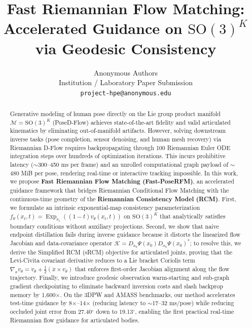 \documentclass[10pt,twocolumn,letterpaper]{article}
\DeclareMathOperator{\Exp}{Exp}
\begin{document}
\title{\textbf{Fast Riemannian Flow Matching: Accelerated Guidance on $\mathrm{SO}(3)^K$ via Geodesic Consistency}}

\author{
Anonymous Authors\\
Institution / Laboratory Paper Submission\\
{\tt\small project-hpe@anonymous.edu}
}

\maketitle

\begin{abstract}
Generative modeling of human pose directly on the Lie group product manifold $\mathcal{M} = \mathrm{SO}(3)^K$ (PoseD-Flow) achieves state-of-the-art fidelity and valid articulated kinematics by eliminating out-of-manifold artifacts. However, solving downstream inverse tasks (pose completion, sensor denoising, and human mesh recovery) via Riemannian D-Flow requires backpropagating through 100 Riemannian Euler ODE integration steps over hundreds of optimization iterations. This incurs prohibitive latency ($\sim$300--450 ms per frame) and an unrolled computational graph payload of $\sim$480 MiB per pose, rendering real-time or interactive tracking impossible. In this work, we propose \textbf{Fast Riemannian Flow Matching (Fast-PoseRFM)}, an accelerated guidance framework that bridges Riemannian Conditional Flow Matching with the continuous-time geometry of the \textbf{Riemannian Consistency Model (RCM)}. First, we formulate an intrinsic exponential-map consistency parameterization $f_\theta(x_t, t) = \Exp_{x_t}((1-t)v_\theta(x_t, t))$ on $\mathrm{SO}(3)^K$ that analytically satisfies boundary conditions without auxiliary projections. Second, we show that naive endpoint distillation fails during inverse guidance because it distorts the linearized flow Jacobian and data-covariance operator $\mathcal{K} = D_{x_0}\Psi(x_0) D_{x_0}\Psi(x_0)^*$; to resolve this, we derive the Simplified RCM (sRCM) objective for articulated joints, proving that the Levi-Civita covariant derivative reduces to a Lie bracket Coriolis term $\nabla_{\dot{x}} v_\theta = \dot{v}_\theta + \frac{1}{2}(\dot{x} \times v_\theta)$ that enforces first-order Jacobian alignment along the flow trajectory. Finally, we introduce geodesic observation warm-starting and sub-graph gradient checkpointing to eliminate backward inversion costs and slash backprop memory by 1,600$\times$. On the 3DPW and AMASS benchmarks, our method accelerates test-time guidance by 8$\times$--14$\times$ (reducing latency to $\sim$17--32 ms/pose) while reducing occluded joint error from 27.40$^\circ$ down to 19.13$^\circ$, enabling the first practical real-time Riemannian flow guidance for articulated bodies.
\end{abstract}
\end{document}
